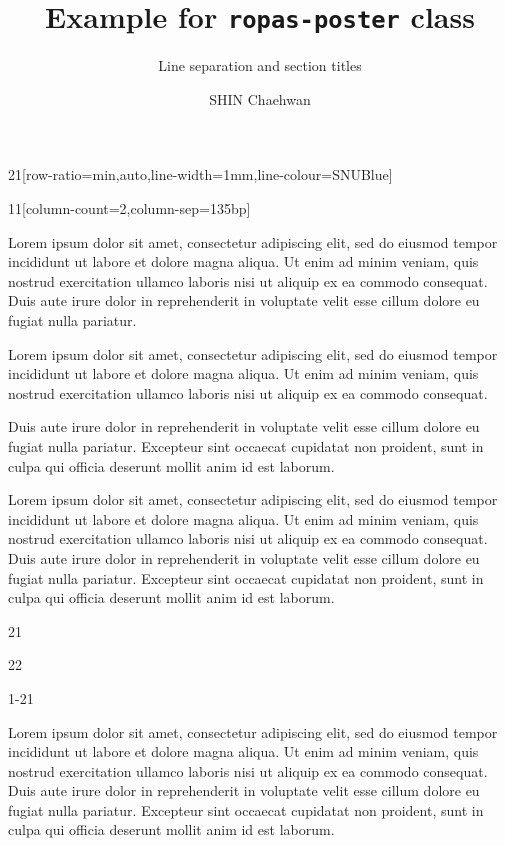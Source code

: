 \documentclass{ropas-poster}
\title{Example for \texttt{ropas-poster} class}
\subtitle{Line separation and section titles}
\author{SHIN Chaehwan}
\institute{Programming Research Laboratory (ROPAS), Seoul National University}
\begin{document}
  \begin{postergrid}{2}{1}[row-ratio={min,auto},line-width=1mm,line-colour=SNUBlue]
    \begin{posterblock}{1}{1}[column-count=2,column-sep=135bp]

      Lorem ipsum dolor sit amet, consectetur adipiscing elit, sed do eiusmod tempor incididunt ut labore et dolore magna aliqua.
      Ut enim ad minim veniam, quis nostrud exercitation ullamco laboris nisi ut aliquip ex ea commodo consequat.
      Duis aute irure dolor in reprehenderit in voluptate velit esse cillum dolore eu fugiat nulla pariatur.


      Lorem ipsum dolor sit amet, consectetur adipiscing elit, sed do eiusmod tempor incididunt ut labore et dolore magna aliqua.
      Ut enim ad minim veniam, quis nostrud exercitation ullamco laboris nisi ut aliquip ex ea commodo consequat.

      Duis aute irure dolor in reprehenderit in voluptate velit esse cillum dolore eu fugiat nulla pariatur.
      Excepteur sint occaecat cupidatat non proident, sunt in culpa qui officia deserunt mollit anim id est laborum.


      Lorem ipsum dolor sit amet, consectetur adipiscing elit, sed do eiusmod tempor incididunt ut labore et dolore magna aliqua.
      Ut enim ad minim veniam, quis nostrud exercitation ullamco laboris nisi ut aliquip ex ea commodo consequat.
      Duis aute irure dolor in reprehenderit in voluptate velit esse cillum dolore eu fugiat nulla pariatur.
      Excepteur sint occaecat cupidatat non proident, sunt in culpa qui officia deserunt mollit anim id est laborum.
    \end{posterblock}

    \begin{posterblock*}{2}{1}
      \begin{postergrid}{2}{2}
        \begin{posterblock}{1-2}{1}


          Lorem ipsum dolor sit amet, consectetur adipiscing elit, sed do eiusmod tempor incididunt ut labore et dolore magna aliqua.
          Ut enim ad minim veniam, quis nostrud exercitation ullamco laboris nisi ut aliquip ex ea commodo consequat.
          Duis aute irure dolor in reprehenderit in voluptate velit esse cillum dolore eu fugiat nulla pariatur.
          Excepteur sint occaecat cupidatat non proident, sunt in culpa qui officia deserunt mollit anim id est laborum.


\end{posterblock}
\end{postergrid}
\end{posterblock*}
\end{postergrid}
\end{document}
